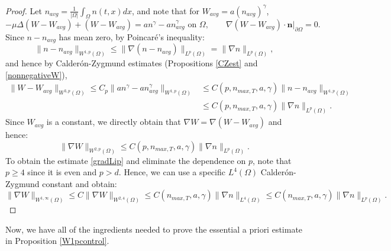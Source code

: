\documentclass[12pt]{article}
\newcommand{\bd}{\boldsymbol}
\theoremstyle{plain}
\begin{document}
\begin{proof}
Let $n_{avg} = \displaystyle \frac{1}{|\Omega|} \int_{\Omega} n(t, x) dx$, and note that for $W_{avg} = a(n_{avg})^{\gamma}$,
\begin{equation*}
-\mu \Delta (W - W_{avg}) + (W - W_{avg}) = an^{\gamma} - an_{avg}^{\gamma} \text{ on } \Omega, \qquad \nabla (W - W_{avg}) \cdot \bd{n}|_{\partial \Omega} = 0.
\end{equation*}
Since $n - n_{avg}$ has mean zero, by Poincar\'{e}'s inequality:
\begin{equation*}
\|n - n_{avg}\|_{W^{1, p}(\Omega)} \le \|\nabla(n - n_{avg})\|_{L^{p}(\Omega)} = \|\nabla n \|_{L^{p}(\Omega)},
\end{equation*}
and hence by Calder\'{o}n-Zygmund estimates (Propositions \ref{CZest} and \ref{nonnegativeW}), 
\begin{align*}
\|W - W_{avg}\|_{W^{3, p}(\Omega)} \le C_{p} \|an^{\gamma} - an^{\gamma}_{avg}\|_{W^{1, p}(\Omega)} &\le C(p, n_{max, T}, a, \gamma) \|n - n_{avg}\|_{W^{1, p}(\Omega)} \\
&\le C(p, n_{max, T}, a, \gamma) \|\nabla n\|_{L^{p}(\Omega)}.
\end{align*}
Since $W_{avg}$ is a constant, we directly obtain that $\nabla W = \nabla (W - W_{avg})$ and hence:
\begin{equation*}
\|\nabla W\|_{W^{2, p}(\Omega)} \le C(p, n_{max, T}, a, \gamma) \|\nabla n\|_{L^{p}(\Omega)}.
\end{equation*}
To obtain the estimate \eqref{gradLip} and eliminate the dependence on $p$, note that $p \ge 4$ since it is even and $p > d$. Hence, we can use a specific $L^{4}(\Omega)$ Calder\'{o}n-Zygmund constant and obtain:
\begin{equation*}
\|\nabla W\|_{W^{1, \infty}(\Omega)} \le C\|\nabla W\|_{W^{2, 4}(\Omega)} \le C(n_{max, T}, a, \gamma) \|\nabla n\|_{L^{4}(\Omega)} \le C(n_{max, T}, a, \gamma) \|\nabla n\|_{L^{p}(\Omega)}.
\end{equation*}
\end{proof}

Now, we have all of the ingredients needed to prove the essential a priori estimate in Proposition \ref{W1pcontrol}.
\end{document}
